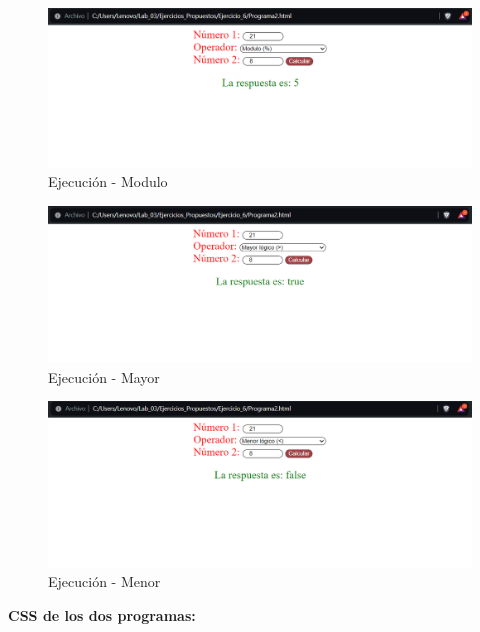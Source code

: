 \documentclass{article}
\begin{document}
	\begin{figure}[H]
		\centering
		\includegraphics[width=1\textwidth,keepaspectratio]{img/mod.png}
		\caption{Ejecución - Modulo}
	\end{figure}
	\begin{figure}[H]
		\centering
		\includegraphics[width=1\textwidth,keepaspectratio]{img/may.png}
		\caption{Ejecución - Mayor}
	\end{figure}
	\begin{figure}[H]
		\centering
		\includegraphics[width=1\textwidth,keepaspectratio]{img/men.png}
		\caption{Ejecución - Menor}
	\end{figure}
	\textbf{CSS de los dos programas: }
	
\end{document}
